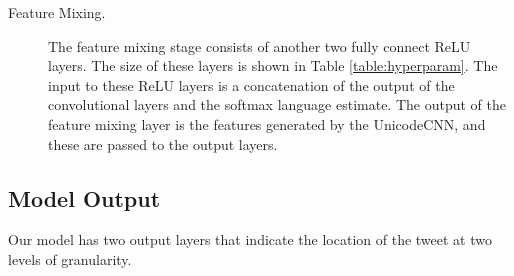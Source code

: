 \documentclass[sigconf,anonymous,review,10pt]{acmart}
\begin{document}
\begin{description}

\item[Feature Mixing.]
The feature mixing stage consists of another two fully connect ReLU layers.
The size of these layers is shown in Table \ref{table:hyperparam}.
The input to these ReLU layers is a concatenation of the output of the convolutional layers and the softmax language estimate.
The output of the feature mixing layer is the features generated by the UnicodeCNN,
and these are passed to the output layers.


\end{description}


\subsection{Model Output}

Our model has two output layers that indicate the location of the tweet at two levels of granularity.
\end{document}
